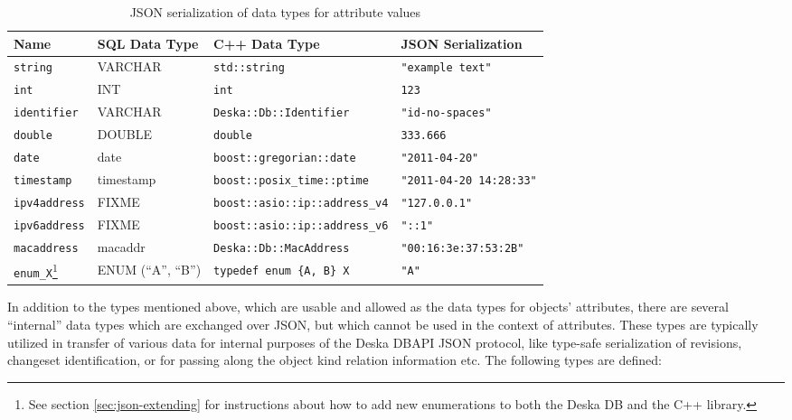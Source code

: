 \documentclass{article}
\begin{document}
\begin{longtable}{ p{20mm} | p{29mm} p{47mm} p{30mm} }
    \caption{JSON serialization of data types for attribute values} \\
    Name & SQL Data Type & C++ Data Type & JSON Serialization \\
    \hline
    \endhead
    {\tt string} & VARCHAR & {\tt std::string} & {\tt "example text"} \\
    {\tt int} & INT & {\tt int} & {\tt 123} \\
    {\tt identifier} & VARCHAR & {\tt Deska::Db::Identifier} & {\tt "id-no-spaces"} \\
    {\tt double} & DOUBLE & {\tt double} & {\tt 333.666} \\
    {\tt date} & date & {\tt boost::gregorian::date} & {\tt "2011-04-20"} \\
    {\tt timestamp} & timestamp & {\tt boost::posix\_time::ptime} & {\tt "2011-04-20 14:28:33"} \\
    {\tt ipv4address} & FIXME & {\tt boost::asio::ip::address\_v4} & {\tt "127.0.0.1"} \\
    {\tt ipv6address} & FIXME & {\tt boost::asio::ip::address\_v6} & {\tt "::1"} \\
    {\tt macaddress} & macaddr & {\tt Deska::Db::MacAddress} & {\tt "00:16:3e:37:53:2B"} \\
    {\tt enum\_X}\footnote{See section \ref{sec:json-extending} for instructions about how to add new enumerations to both
        the Deska DB and the C++ library.} & ENUM (``A'', ``B'') & {\tt typedef enum \{A, B\} X} & {\tt "A"} \\
\end{longtable}

In addition to the types mentioned above, which are usable and allowed as the data types for objects' attributes, there
are several ``internal'' data types which are exchanged over JSON, but which cannot be used in the context of
attributes.  These types are typically utilized in transfer of various data for internal purposes of the Deska
DBAPI JSON protocol, like type-safe serialization of revisions, changeset identification, or for passing along the object kind
relation information etc.  The following types are defined:
\end{document}
